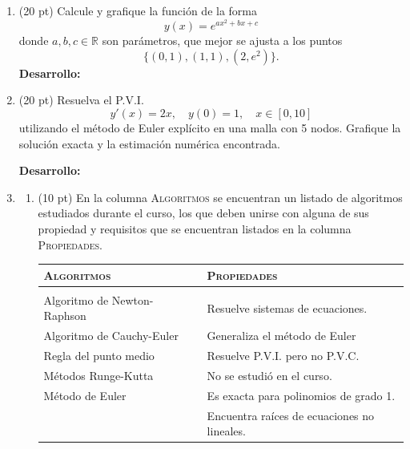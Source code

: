 \documentclass[11pt]{article}
\begin{document}
\begin{enumerate}
\newpage 
\item  (20 pt)
Calcule y grafique la funci\'on de la forma
$$
y(x)=e^{ax^2+bx+c}
$$
donde $a,b,c\in\mathbb{R}$ son par\'ametros, que mejor se ajusta a los puntos
$$
\{(0,1),(1,1),(2,e^2)\}.
$$
\textbf{Desarrollo:}


\newpage
\item  (20 pt) Resuelva el P.V.I.
$$ 
y'(x)=2x, \quad y(0)=1, \quad x\in[0,10]
$$
utilizando el método de Euler explícito en una malla con 5 nodos. Grafique la soluci\'on exacta y la estimaci\'on num\'erica encontrada.

\textbf{Desarrollo:}

\newpage
\item  \begin{enumerate}
\item (10 pt) En la columna \textsc{Algoritmos} se encuentran un listado de algoritmos estudiados durante el curso, los que deben unirse con alguna de sus propiedad y requisitos que se encuentran listados en la columna \textsc{Propiedades}.
\begin{center}
	\begin{tabular}{||p{4cm}|p{7cm}|p{4cm}||}
    \hline \hline
	\textsc{Algoritmos}	& & \textsc{Propiedades}    \\ \hline & &\\ \hline  
    Algoritmo de Newton-Raphson & & Resuelve sistemas de ecuaciones. \\ \hline
    Algoritmo de Cauchy-Euler	& & Generaliza el método de Euler\\ \hline
    Regla del punto medio		& & Resuelve P.V.I. pero no P.V.C.\\ \hline
    M\'etodos Runge-Kutta		& & No se estudi\'o en el curso.\\ \hline
	M\'etodo de Euler			& & Es exacta para polinomios de grado 1.\\ \hline
    							& & Encuentra ra\'ices de ecuaciones no lineales.\\ \hline
   \end{tabular}
\end{center}


\end{enumerate}
\end{enumerate}
\end{document}
